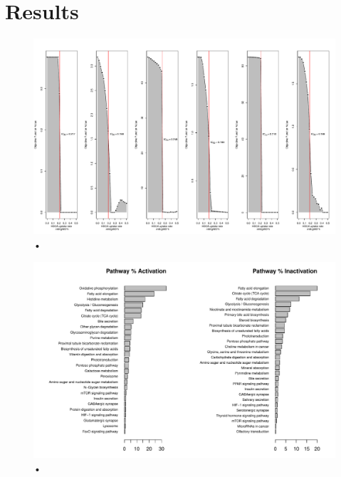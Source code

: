 \section{Results}
\begin{figure}[h]
\begin{center}
\includegraphics[width=\textwidth]{neuroprotective/IC50}
\end{center}
\caption{•}
\end{figure}
\begin{figure}[h]
\begin{center}
\includegraphics[width=\textwidth]{neuroprotective/Healthy2Inflammated}
\end{center}
\caption{•}
\end{figure}
